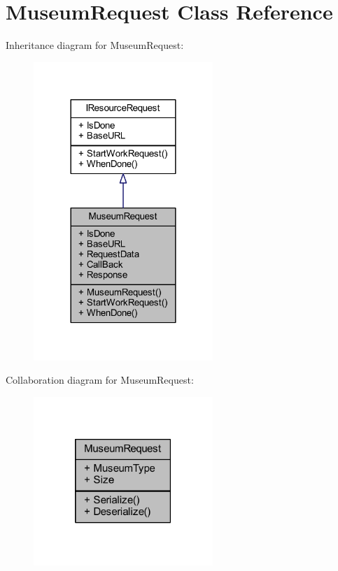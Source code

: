 \hypertarget{class_museum_request}{}\section{Museum\+Request Class Reference}
\label{class_museum_request}


Inheritance diagram for Museum\+Request\+:
\nopagebreak
\begin{figure}[H]
\begin{center}
\leavevmode
\includegraphics[width=192pt]{class_museum_request__inherit__graph}
\end{center}
\end{figure}


Collaboration diagram for Museum\+Request\+:
\nopagebreak
\begin{figure}[H]
\begin{center}
\leavevmode
\includegraphics[width=192pt]{class_museum_request__coll__graph}
\end{center}
\end{figure}
